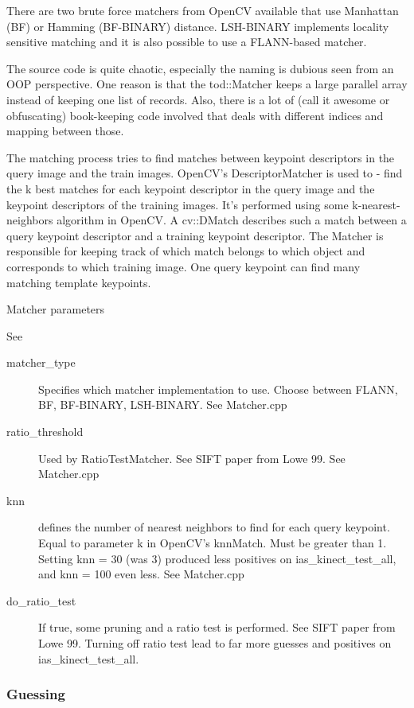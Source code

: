 There are two brute force matchers from OpenCV available that use Manhattan
(BF) or Hamming (BF-BINARY) distance. LSH-BINARY implements  locality sensitive
matching and it is also possible to use a FLANN-based matcher.

The source code is quite chaotic, especially the naming is dubious seen from an
OOP perspective.  One reason is that the tod::Matcher keeps a large parallel
array instead of keeping one list of records. Also, there is a lot of (call it
awesome or obfuscating) book-keeping code involved that deals with different
indices and mapping between those.

The matching process tries to find matches between keypoint descriptors in the
query image and the train images. OpenCV's DescriptorMatcher is used to - find
the k best matches for each keypoint descriptor in the query image and the
keypoint descriptors of the training images. It's performed using some
k-nearest-neighbors algorithm in OpenCV. A cv::DMatch describes such a match
between a query keypoint descriptor and a training keypoint descriptor. The
Matcher is responsible for keeping track of which match belongs to which object
and corresponds to which training image. One query keypoint can find many
matching template keypoints. 


Matcher parameters

See
\begin{description}
    \item[matcher\_type] Specifies which matcher implementation to use. Choose
        between FLANN, BF, BF-BINARY, LSH-BINARY.  See Matcher.cpp
    \item[ratio\_threshold] Used by RatioTestMatcher. See SIFT paper from Lowe 99. See Matcher.cpp
    \item[knn] defines the number of nearest neighbors to find for each query
        keypoint. Equal to parameter k in OpenCV's knnMatch. Must be greater than 1.
        Setting knn = 30 (was 3) produced less positives on ias\_kinect\_test\_all, and
        knn = 100 even less. See Matcher.cpp
    \item[do\_ratio\_test] If true, some pruning and a ratio test is performed.
        See SIFT paper from Lowe 99.  Turning off ratio test lead to far more
        guesses and positives on ias\_kinect\_test\_all.
\end{description}


\subsubsection*{Guessing}

